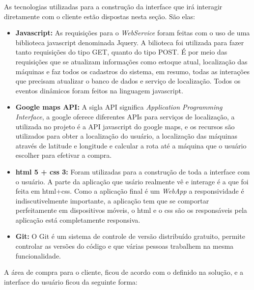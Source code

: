 As tecnologias utilizadas para a construção da interface que irá interagir diretamente com o cliente estão dispostas nesta seção. São elas:

\begin{itemize}
\item \textbf{Javascript:} As requisições para o \textit{WebService} foram feitas com o uso de uma biblioteca javascript denominada Jquery. A bilioteca foi utilizada para fazer tanto requisições do tipo GET, quanto do tipo POST. É por meio das requisições que se atualizam informações como estoque atual, localização das máquinas e faz todos os cadastros do sistema, em resumo, todas as interações que precisam atualizar o banco de dados e serviço de localização. Todos os eventos dinâmicos foram feitos na linguagem javascript.
\item \textbf{Google maps API:} A sigla API significa \textit{Application Programming Interface}, a google oferece diferentes APIs para serviços de localização, a utilizada no projeto é a API javascript do google maps, e os recursos são utilizados para obter a localização do usuário, a localização das máquinas através de latitude e longitude e calcular a rota até a máquina que o usuário escolher para efetivar a compra.
\item\textbf{ html 5 + css 3:} Foram utilizadas para a construção de toda a interface com o usuário. A parte da aplicação que usário realmente vê e interage é a que foi feita em html+css. Como a aplicação final é um \textit{WebApp} a responsividade é indiscutivelmente importante, a aplicação tem que se comportar perfeitamente em dispositivos móveis, o html e o css são os responsáveis pela aplicação está completamente responsiva.
\item\textbf{Git:} O Git é um sistema de controle de versão distribuído gratuito, permite controlar as versões do código e que várias pessoas trabalhem na mesma funcionalidade.
\end{itemize}

A área de compra para o cliente, ficou de acordo com o definido na solução, e a interface do usuário ficou da seguinte forma:


